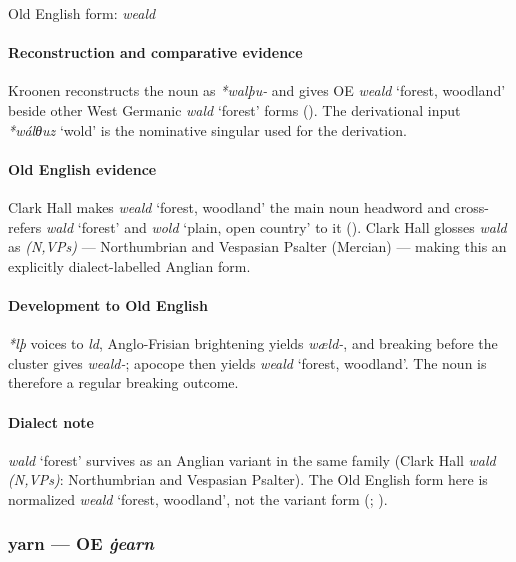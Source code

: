 \documentclass[
  british,
  a4paper,
]{article}
\providecommand{\Recon}[1]{\emph{*#1}}
\begin{document}
Old English form: \emph{weald}

\paragraph{Reconstruction and comparative
evidence}\label{reconstruction-and-comparative-evidence-72}

Kroonen reconstructs the noun as \emph{*walþu-} and gives OE
{\emph{weald}} `forest, woodland' beside other West Germanic
{\emph{wald}} `forest' forms ().
The derivational input \Recon{wálθuz} `wold' is the nominative singular
used for the derivation.

\paragraph{Old English evidence}\label{old-english-evidence-72}

Clark Hall makes {\emph{weald}} `forest, woodland' the main noun
headword and cross-refers {\emph{wald}} `forest' and {\emph{wold}}
`plain, open country' to it (). Clark Hall glosses \emph{wald} as \emph{(N,VPs)} ---
Northumbrian and Vespasian Psalter (Mercian) --- making this an
explicitly dialect-labelled Anglian form.

\paragraph{Development to Old
English}\label{development-to-old-english-72}

\emph{*lþ} voices to \emph{ld}, Anglo-Frisian brightening yields
\emph{wæld-}, and breaking before the cluster gives \emph{weald-};
apocope then yields {\emph{weald}} `forest, woodland'. The noun is
therefore a regular breaking outcome.

\paragraph{Dialect note}\label{dialect-note-6}

{\emph{wald}} `forest' survives as an Anglian variant in the same family
(Clark Hall \emph{wald (N,VPs)}: Northumbrian and Vespasian Psalter).
The Old English form here is normalized {\emph{weald}} `forest,
woodland', not the variant form (; ).

\subsubsection{\texorpdfstring{yarn --- OE
\emph{ġearn}}{yarn --- OE ġearn}}\label{yarn-oe-ux121earn}
\end{document}
